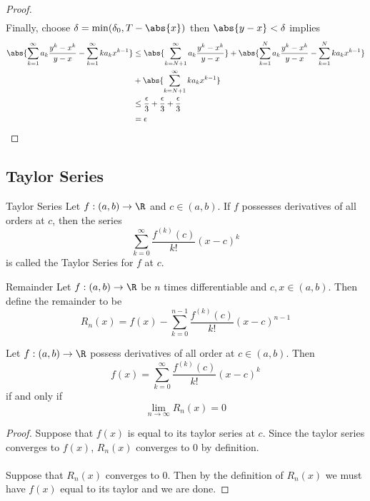 \begin{thm}{}{}
\begin{proof}
\begin{align*}
\end{align*}
Finally, choose $\delta=\min(\delta_0,T-\abs{x})$ then $\abs{y-x}<\delta$ implies
\begin{align*}
\abs{\sum_{k=1}^\infty a_k\frac{y^k-x^k}{y-x}-\sum_{k=1}^\infty ka_kx^{k-1}}&\leq\abs{\sum_{k=N+1}^\infty a_k\frac{y^k-x^k}{y-x}}+\abs{\sum_{k=1}^N a_k\frac{y^k-x^k}{y-x}-\sum_{k=1}^N ka_kx^{k-1}}\\
&+\abs{\sum_{k=N+1}^\infty ka_kx^{k-1}}\\
&\leq\frac{\epsilon}{3}+\frac{\epsilon}{3}+\frac{\epsilon}{3}\\
&=\epsilon
\end{align*}
\end{proof}
\end{thm}

\subsection{Taylor Series}
\begin{defn}{Taylor Series}{} Let $f:(a,b)\to\R$ and $c\in(a,b)$. If $f$ possesses derivatives of all orders at $c$, then the series $$\sum_{k=0}^{\infty}\frac{f^{(k)}(c)}{k!}(x-c)^k$$ is called the Taylor Series for $f$ at $c$. 
\end{defn}

\begin{defn}{Remainder}{} Let $f:(a,b)\to\R$ be $n$ times differentiable and $c,x\in(a,b)$. Then define the remainder to be $$R_n(x)=f(x)-\sum_{k=0}^{n-1}\frac{f^{(k)}(c)}{k!}(x-c)^{n-1}$$
\end{defn}

\begin{thm}{}{} Let $f:(a,b)\to\R$ possess derivatives of all order at $c\in(a,b)$. Then $$f(x)=\sum_{k=0}^{\infty}\frac{f^{(k)}(c)}{k!}(x-c)^k$$ if and only if $$\lim_{n\to\infty}R_n(x)=0$$ \tcbline
\begin{proof}
Suppose that $f(x)$ is equal to its taylor series at $c$. Since the taylor series converges to $f(x)$, $R_n(x)$ converges to $0$ by definition. \\~\\
Suppose that $R_n(x)$ converges to $0$. Then by the definition of $R_n(x)$ we must have $f(x)$ equal to its taylor and we are done. 
\end{proof}
\end{thm}

